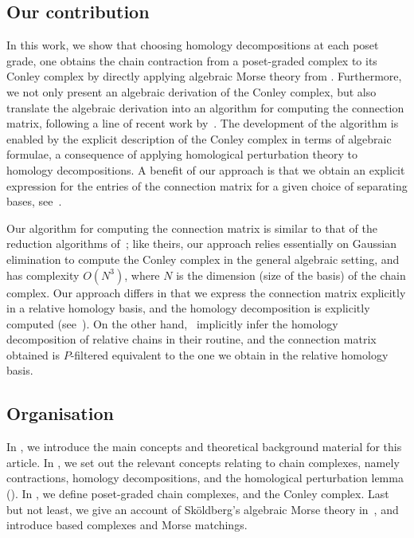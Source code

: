 \documentclass[11pt, table, nothms]{amsart}
\theoremstyle{definition}
\begin{document}
\subsection*{Our contribution}

In this work, we show that choosing homology decompositions at each poset grade, one obtains the chain contraction from a poset-graded complex to its Conley complex by directly applying algebraic Morse theory from \cite{Skoldberg2018}.
Furthermore, we not only present an algebraic derivation of the Conley complex, but also translate the algebraic derivation into an algorithm for computing the connection matrix, following a line of recent work by~\cite{harker2021,Dey2024ComputingReductions,Mrozek2025ConnectionDynamics}. The development of the algorithm is enabled by the explicit description of the Conley complex in terms of algebraic formulae, a consequence of applying homological perturbation theory to homology decompositions. 
A benefit of our approach is that we obtain an explicit expression for the entries of the connection matrix for a given choice of separating bases, see~.

Our algorithm for computing the connection matrix is similar to that of the reduction algorithms of~\cite{Dey2024ComputingReductions,Dey2025ComputingDecomposition}; like theirs, our approach relies essentially on Gaussian elimination to compute the Conley complex in the general algebraic setting, and has complexity $O(N^3)$, where $N$ is the dimension (size of the basis) of the chain complex. 
Our approach differs in that we express the connection matrix explicitly in a relative homology basis, and the homology decomposition is explicitly computed (see~). On the other hand,~\cite{Dey2024ComputingReductions,Dey2025ComputingDecomposition} implicitly infer the homology decomposition of relative chains in their routine, and the connection matrix obtained is $P$-filtered equivalent to the one we obtain in the relative homology basis. 


\subsection*{Organisation}
In , we introduce the main concepts and theoretical background material for this article. In , we set out the relevant concepts relating to chain complexes, namely contractions, homology decompositions, and the homological perturbation lemma (). In , we define poset-graded chain complexes, and the Conley complex. Last but not least, we give an account of Sk\"oldberg's algebraic Morse theory in~, and introduce based complexes and Morse matchings. 
\end{document}
